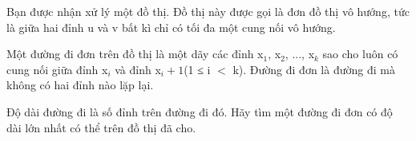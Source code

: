 Bạn được nhận xử lý một đồ thị. Đồ thị này được gọi là đơn đồ thị vô hướng, tức là giữa hai đỉnh u và v bất kì chỉ có tối đa một cung nối vô hướng.

Một đường đi đơn trên đồ thị là một dãy các đỉnh x$_1$, x$_2$, ..., x$_k$ sao cho luôn có cung nối giữa đỉnh x$_i$ và đỉnh x$_i + 1$(1 ≤ i $<$ k). Đường đi đơn là đường đi mà không có hai đỉnh nào lặp lại.

Độ dài đường đi là số đỉnh trên đường đi đó. Hãy tìm một đường đi đơn có độ dài lớn nhất có thể trên đồ thị đã cho.